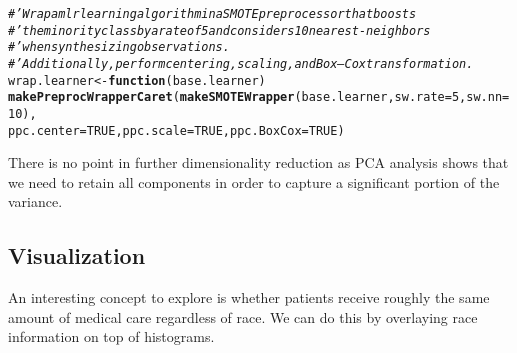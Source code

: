 \documentclass{article}\usepackage[]{graphicx}\usepackage[]{color}
\makeatletter
\newcommand{\hlnum}[1]{\textcolor[rgb]{0.686,0.059,0.569}{#1}}%
\newcommand{\hlcom}[1]{\textcolor[rgb]{0.678,0.584,0.686}{\textit{#1}}}%
\newcommand{\hlstd}[1]{\textcolor[rgb]{0.345,0.345,0.345}{#1}}%
\newcommand{\hlkwa}[1]{\textcolor[rgb]{0.161,0.373,0.58}{\textbf{#1}}}%
\newcommand{\hlkwb}[1]{\textcolor[rgb]{0.69,0.353,0.396}{#1}}%
\newcommand{\hlkwc}[1]{\textcolor[rgb]{0.333,0.667,0.333}{#1}}%
\newcommand{\hlkwd}[1]{\textcolor[rgb]{0.737,0.353,0.396}{\textbf{#1}}}%
\newenvironment{kframe}{%
 \def\at@end@of@kframe{}%
 \ifinner\ifhmode%
  \def\at@end@of@kframe{\end{minipage}}%
  \begin{minipage}{\columnwidth}%
 \fi\fi%
 \def\FrameCommand##1{\hskip\@totalleftmargin \hskip-\fboxsep
 \colorbox{shadecolor}{##1}\hskip-\fboxsep
     \hskip-\linewidth \hskip-\@totalleftmargin \hskip\columnwidth}%
 \MakeFramed {\advance\hsize-\width
   \@totalleftmargin\z@ \linewidth\hsize
   \@setminipage}}%
 {\par\unskip\endMakeFramed%
 \at@end@of@kframe}
\newenvironment{knitrout}{}{} %
\makeatother
\begin{document}
\begin{knitrout}
\color{fgcolor}\begin{kframe}
\begin{alltt}
\hlcom{#' Wrap a mlr learning algorithm in a SMOTE preprocessor that boosts}
\hlcom{#' the minority class by a rate of 5 and considers 10 nearest-neighbors}
\hlcom{#' when synthesizing observations.}
\hlcom{#' Additionally, perform centering, scaling, and Box--Cox transformation.}
\hlstd{wrap.learner} \hlkwb{<-} \hlkwa{function} \hlstd{(}\hlkwc{base.learner}\hlstd{)}
    \hlkwd{makePreprocWrapperCaret}\hlstd{(}\hlkwd{makeSMOTEWrapper}\hlstd{(base.learner,} \hlkwc{sw.rate}\hlstd{=}\hlnum{5}\hlstd{,} \hlkwc{sw.nn}\hlstd{=}\hlnum{10}\hlstd{),}
                            \hlkwc{ppc.center}\hlstd{=}\hlnum{TRUE}\hlstd{,} \hlkwc{ppc.scale}\hlstd{=}\hlnum{TRUE}\hlstd{,} \hlkwc{ppc.BoxCox}\hlstd{=}\hlnum{TRUE}\hlstd{)}
\end{alltt}
\end{kframe}
\end{knitrout}

There is no point in further dimensionality reduction as PCA analysis shows that
we need to retain all components in order to capture a significant portion of
the variance.

\subsection{Visualization}

An interesting concept to explore is whether patients receive roughly the same
amount of medical care regardless of race.  We can do this by overlaying race
information on top of histograms.
\end{document}
